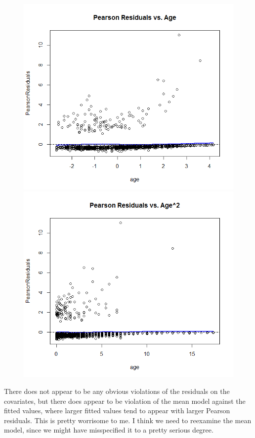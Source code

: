 \documentclass[11pt]{article}
\begin{document}
\begin{enumerate}
\begin{figure}[H]
		\includegraphics[scale=0.4]{Rplot4-mean7}
		\includegraphics[scale=0.4]{Rplot4-mean8}
	\end{figure}
	There does not appear to be any obvious violations of the residuals on the covariates, but there does appear to be violation of the mean model against the fitted values, where larger fitted values tend to appear with larger Pearson residuals. This is pretty worrisome to me. I think we need to reexamine the mean model, since we might have misspecified it to a pretty serious degree.
\end{enumerate}
\end{document}
